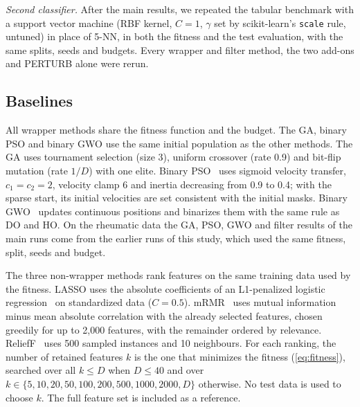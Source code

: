 \documentclass[journal]{IEEEtran}
\begin{document}
\emph{Second classifier.} After the main results, we repeated the tabular benchmark with a support vector machine (RBF kernel, $C=1$, $\gamma$ set by scikit-learn's \texttt{scale} rule, untuned) in place of 5-NN, in both the fitness and the test evaluation, with the same splits, seeds and budgets. Every wrapper and filter method, the two add-ons and PERTURB alone were rerun.

\subsection{Baselines}
All wrapper methods share the fitness function and the budget. The GA, binary PSO and binary GWO use the same initial population as the other methods. The GA uses tournament selection (size 3), uniform crossover (rate 0.9) and bit-flip mutation (rate $1/D$) with one elite. Binary PSO~\cite{kennedy1997} uses sigmoid velocity transfer, $c_1=c_2=2$, velocity clamp 6 and inertia decreasing from 0.9 to 0.4; with the sparse start, its initial velocities are set consistent with the initial masks. Binary GWO~\cite{mirjalili2014gwo,emary2016bgwo} updates continuous positions and binarizes them with the same rule as DO and HO. On the rheumatic data the GA, PSO, GWO and filter results of the main runs come from the earlier runs of this study, which used the same fitness, split, seeds and budget.

The three non-wrapper methods rank features on the same training data used by the fitness. LASSO uses the absolute coefficients of an L1-penalized logistic regression~\cite{tibshirani1996} on standardized data ($C=0.5$). mRMR~\cite{peng2005} uses mutual information minus mean absolute correlation with the already selected features, chosen greedily for up to 2,000 features, with the remainder ordered by relevance. ReliefF~\cite{kononenko1994} uses 500 sampled instances and 10 neighbours. For each ranking, the number of retained features $k$ is the one that minimizes the fitness (\ref{eq:fitness}), searched over all $k\le D$ when $D\le40$ and over $k\in\{5,10,20,50,100,200,500,1000,2000,D\}$ otherwise. No test data is used to choose $k$. The full feature set is included as a reference.
\end{document}
